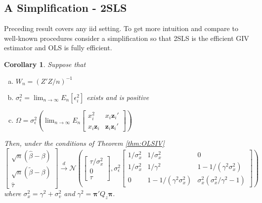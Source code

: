 \documentclass[12pt]{article}
\newtheorem{cor}{Corollary}[section]
\theoremstyle{definition}
\begin{document}
\subsection{A Simplification - 2SLS}
Preceding result covers any iid setting. To get more intuition and compare to well-known procedures consider a simplification so that 2SLS is the efficient GIV estimator and OLS is fully efficient. 

\begin{cor}
Suppose that 
  \begin{enumerate}[(a)]
    \item $W_n =(Z'Z/n)^{-1}$
    \item $\sigma_\epsilon^2 = \lim_{n \rightarrow \infty} E_n[\epsilon_i^2]$ exists and is positive
    \item $\displaystyle \Omega =\sigma_\epsilon^2 \left(\lim_{n\rightarrow \infty} E_n \left[
    \begin{array}{cc}
      x_i^2 & x_i \mathbf{z}_i' \\
       x_i \mathbf{z}_i& \mathbf{z}_i \mathbf{z}_i'
    \end{array}
    \right]\right)$
  \end{enumerate}
Then, under the conditions of Theorem \ref{thm:OLSIV}
$$
\left[
\begin{array}{c}
  \sqrt{n}\left(\widehat{\beta} - \beta\right) \\
  \sqrt{n}\left(\widetilde{\beta} - \beta\right)\\
  \widehat{\tau}
\end{array}
\right] \overset{d}{\rightarrow}
\mathcal{N}\left(
\left[
\begin{array}{c}
\tau/\sigma_x^2 \\ 
0\\
\tau
\end{array}
\right],
\sigma_\epsilon^2 \left[ \begin{array}{ccc}
  1/\sigma_x^2 & 1/\sigma_x^2 & 0\\
  1/\sigma_x^2 & 1/\gamma^2 & 1 - 1/(\gamma^2\sigma_x^2)\\
  0& 1 - 1/(\gamma^2 \sigma_x^2) & \sigma_x^2(\sigma_x^2/\gamma^2 - 1)
  \end{array}\right]
  \right)
$$
where $\sigma_x^2 = \gamma^2 + \sigma_v^2$ and $\gamma^2 = \boldsymbol{\pi}'Q_z \boldsymbol{\pi}$.
\end{cor}
\end{document}
